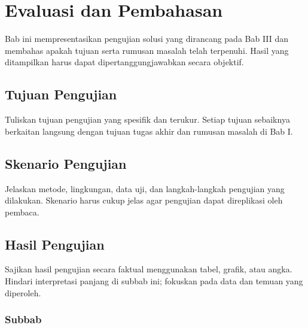 %
%
%
%
%

\chapter{Evaluasi dan Pembahasan}

Bab ini mempresentasikan pengujian solusi yang dirancang pada Bab
III dan membahas apakah tujuan serta rumusan masalah telah
terpenuhi. Hasil yang ditampilkan harus dapat dipertanggungjawabkan
secara objektif.

\section{Tujuan Pengujian}

Tuliskan tujuan pengujian yang spesifik dan terukur. Setiap tujuan
sebaiknya berkaitan langsung dengan tujuan tugas akhir dan
rumusan masalah di Bab I.

\blindtext

\section{Skenario Pengujian}

Jelaskan metode, lingkungan, data uji, dan langkah-langkah
pengujian yang dilakukan. Skenario harus cukup jelas agar pengujian
dapat direplikasi oleh pembaca.

\blindtext

\section{Hasil Pengujian}

Sajikan hasil pengujian secara faktual menggunakan tabel, grafik,
atau angka. Hindari interpretasi panjang di subbab ini; fokuskan
pada data dan temuan yang diperoleh.

    \subsection{Subbab}

    \blindtext

